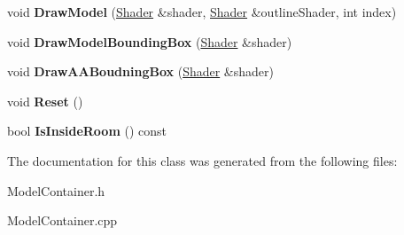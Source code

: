 \begin{DoxyCompactItemize}
\item 
\hypertarget{class_model_container_a9d6352f35e74be676bf923d38ec0b24c}{}void {\bfseries Draw\+Model} (\hyperlink{class_shader}{Shader} \&shader, \hyperlink{class_shader}{Shader} \&outline\+Shader, int index)\label{class_model_container_a9d6352f35e74be676bf923d38ec0b24c}

\item 
\hypertarget{class_model_container_a4f73480431ca9bca8cbcdac87ef1d055}{}void {\bfseries Draw\+Model\+Bounding\+Box} (\hyperlink{class_shader}{Shader} \&shader)\label{class_model_container_a4f73480431ca9bca8cbcdac87ef1d055}

\item 
\hypertarget{class_model_container_a6048f0f26f86025c6854bf42d7c5cc19}{}void {\bfseries Draw\+A\+A\+Boudning\+Box} (\hyperlink{class_shader}{Shader} \&shader)\label{class_model_container_a6048f0f26f86025c6854bf42d7c5cc19}

\item 
\hypertarget{class_model_container_aff6393883a26f3d71476e24e34f58852}{}void {\bfseries Reset} ()\label{class_model_container_aff6393883a26f3d71476e24e34f58852}

\item 
\hypertarget{class_model_container_a84dee4d7878153ecd2971427b2dd4c87}{}bool {\bfseries Is\+Inside\+Room} () const \label{class_model_container_a84dee4d7878153ecd2971427b2dd4c87}

\end{DoxyCompactItemize}


The documentation for this class was generated from the following files\+:\begin{DoxyCompactItemize}
\item 
Model\+Container.\+h\item 
Model\+Container.\+cpp\end{DoxyCompactItemize}
